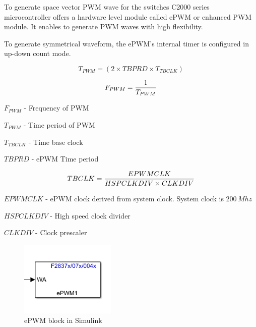 To generate space vector PWM wave for the switches C2000 series microcontroller offers a hardware level module called ePWM or enhanced PWM module. It enables to generate PWM waves with high flexibility.

To generate symmetrical waveform, the ePWM's internal timer is configured in up-down count mode.

\begin{equation}
    T_{PWM} = (2 \times TBPRD \times T_{TBCLK})
\end{equation}

\begin{equation}
    F_{PWM} = {1 \over T_{PWM}}
\end{equation}



$F_{PWM}$ - Frequency of PWM


$T_{PWM}$ - Time period of PWM


$T_{TBCLK}$ - Time base clock


$TBPRD$ - ePWM Time period


$$TBCLK = {EPWMCLK \over HSPCLKDIV \times CLKDIV}$$


$EPWMCLK$ - ePWM clock derived from system clock. System clock is $200 \, Mhz$


$HSPCLKDIV$ - High speed clock divider


$CLKDIV$ - Clock prescaler



\begin{figure}[H]
    \centering
    \includegraphics[width=1.8in]{sections/section6/images/SVPWM/ePWMBlock.png}
    \caption{ePWM block in Simulink}
    \label{fig:svpwm_block}
\end{figure}

\newpage